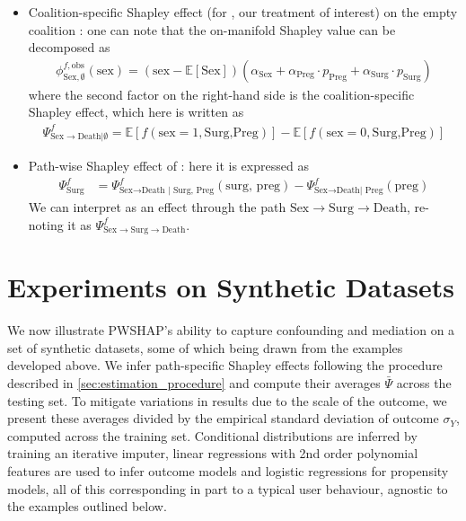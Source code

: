 \documentclass{article}
\theoremstyle{plain}
\theoremstyle{definition}
\theoremstyle{remark}
\newcommand{\effect}{\Psi}
\theoremstyle{mystyle}
\begin{document}
\begin{itemize}
\begin{align*}
    \end{align*}
    \item Coalition-specific Shapley effect (for , our treatment of interest) on the empty coalition : one can note that the on-manifold Shapley value can be decomposed as
    \begin{align*}
        \phi^{f,\text{obs}}_{\text{Sex},\emptyset}(\text{sex}) = (\text{sex} - \mathbb{E}[\text{Sex}]) (\alpha_\text{Sex} + \alpha_\text{Preg} \cdot p_\text{Preg} + \alpha_\text{Surg} \cdot p_\text{Surg})
    \end{align*}
    where the second factor on the right-hand side is the coalition-specific Shapley effect, which here is written as
    \begin{align*}
        \effect^{f}_{\text{Sex} \rightarrow \text{Death}|\emptyset} = \mathbb{E}[f(\text{sex}=1,\text{Surg,Preg})] - \mathbb{E}[f(\text{sex}=0,\text{Surg,Preg})]
    \end{align*}
    \item Path-wise Shapley effect of  : here it is expressed as
    \begin{align*}
\effect^f_{\text{Surg}} &= \effect^f_{\text{Sex} \rightarrow \text{Death | Surg, Preg}}(\text{surg, preg})  - \effect^f_{\text{Sex} \rightarrow \text{Death| Preg}}(\text{preg})
\end{align*}
We can interpret as an effect through the path $\text{Sex} \rightarrow \text{Surg} \rightarrow \text{Death}$, re-noting it as $\effect^f_{\text{Sex} \rightarrow \text{Surg} \rightarrow \text{Death}}$.
\end{itemize}


\iffalse
\section{Experiments on Synthetic Datasets}
\label{sec:exp_synth}

We now illustrate PWSHAP's ability to capture confounding and mediation on a set of synthetic datasets, some of which being drawn from the examples developed above. We infer path-specific Shapley effects following the procedure described in \ref{sec:estimation_procedure}  and compute their averages $\bar{\effect}$ across the testing set. To mitigate variations in results due to the scale of the outcome, we present these averages divided by the empirical standard deviation of outcome $\sigma_Y$, computed across the training set. Conditional distributions are inferred by training an iterative imputer, linear regressions with 2nd order polynomial features are used to infer outcome models and logistic regressions for propensity models, all of this corresponding in part to a typical user behaviour, agnostic to the examples outlined below. 
\end{document}
